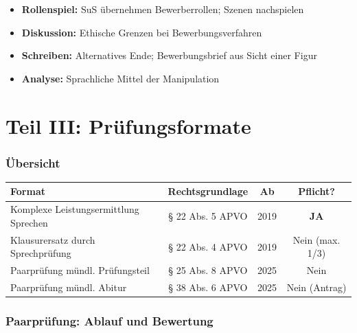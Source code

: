 \documentclass[11pt,a4paper]{article}
\begin{document}
\begin{itemize}[leftmargin=1cm]
\item \textbf{Rollenspiel:} SuS übernehmen Bewerberrollen; Szenen nachspielen
\item \textbf{Diskussion:} Ethische Grenzen bei Bewerbungsverfahren
\item \textbf{Schreiben:} Alternatives Ende; Bewerbungsbrief aus Sicht einer Figur
\item \textbf{Analyse:} Sprachliche Mittel der Manipulation
\end{itemize}

\newpage
\part*{Teil III: Prüfungsformate}

\section{Übersicht}

\begin{center}
\begin{tabularx}{\textwidth}{X|c|c|c}
\rowcolor{lightblue}
\textbf{Format} & \textbf{Rechtsgrundlage} & \textbf{Ab} & \textbf{Pflicht?} \\
\hline
Komplexe Leistungsermittlung Sprechen & § 22 Abs. 5 APVO & 2019 & \textbf{JA} \\
\rowcolor{lightgray}
Klausurersatz durch Sprechprüfung & § 22 Abs. 4 APVO & 2019 & Nein (max. 1/3) \\
Paarprüfung mündl. Prüfungsteil & § 25 Abs. 8 APVO & 2025 & Nein \\
\rowcolor{lightgray}
Paarprüfung mündl. Abitur & § 38 Abs. 6 APVO & 2025 & Nein (Antrag) \\
\hline
\end{tabularx}
\end{center}

\section{Paarprüfung: Ablauf und Bewertung}
\end{document}
